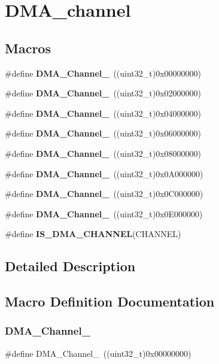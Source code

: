 \section{D\+M\+A\+\_\+channel}
\label{group__DMA__channel}
\subsection*{Macros}
\begin{DoxyCompactItemize}
\item 
\#define \textbf{ D\+M\+A\+\_\+\+Channel\+\_}~((uint32\+\_\+t)0x00000000)
\item 
\#define \textbf{ D\+M\+A\+\_\+\+Channel\+\_}~((uint32\+\_\+t)0x02000000)
\item 
\#define \textbf{ D\+M\+A\+\_\+\+Channel\+\_}~((uint32\+\_\+t)0x04000000)
\item 
\#define \textbf{ D\+M\+A\+\_\+\+Channel\+\_}~((uint32\+\_\+t)0x06000000)
\item 
\#define \textbf{ D\+M\+A\+\_\+\+Channel\+\_}~((uint32\+\_\+t)0x08000000)
\item 
\#define \textbf{ D\+M\+A\+\_\+\+Channel\+\_}~((uint32\+\_\+t)0x0\+A000000)
\item 
\#define \textbf{ D\+M\+A\+\_\+\+Channel\+\_}~((uint32\+\_\+t)0x0\+C000000)
\item 
\#define \textbf{ D\+M\+A\+\_\+\+Channel\+\_}~((uint32\+\_\+t)0x0\+E000000)
\item 
\#define \textbf{ I\+S\+\_\+\+D\+M\+A\+\_\+\+C\+H\+A\+N\+N\+EL}(C\+H\+A\+N\+N\+EL)
\end{DoxyCompactItemize}


\subsection{Detailed Description}


\subsection{Macro Definition Documentation}
\mbox{\label{group__DMA__channel_ga4979fc18bd59701dec52c8fa89b5edb2}} 
\subsubsection{D\+M\+A\+\_\+\+Channel\+\_}
{\footnotesize\ttfamily \#define D\+M\+A\+\_\+\+Channel\+\_~((uint32\+\_\+t)0x00000000)}



